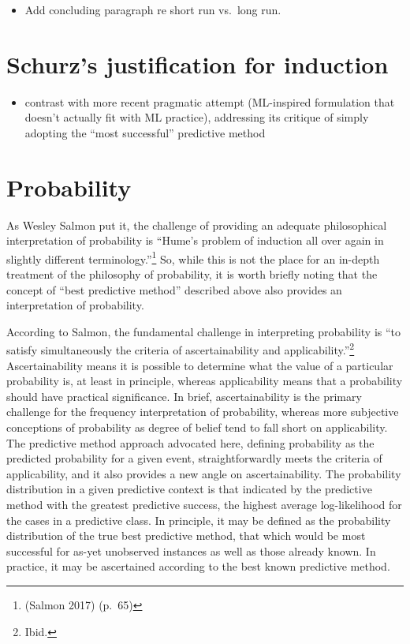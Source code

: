 \documentclass[
  letterpaper,
  DIV=11,
  numbers=noendperiod]{scrartcl}
\providecommand{\tightlist}{%
  \setlength{\itemsep}{0pt}\setlength{\parskip}{0pt}}\usepackage{longtable,booktabs,array}
\theoremstyle{definition}
\theoremstyle{remark}
\begin{document}
\begin{itemize}
\tightlist
\item
  Add concluding paragraph re short run vs.~long run.
\end{itemize}

\section{Schurz's justification for induction}\label{sec-schurz}

\begin{itemize}
\tightlist
\item
  contrast with more recent pragmatic attempt (ML-inspired formulation
  that doesn't actually fit with ML practice), addressing its critique
  of simply adopting the ``most successful'' predictive method
\end{itemize}

\section{Probability}\label{sec-intprob}

As Wesley Salmon put it, the challenge of providing an adequate
philosophical interpretation of probability is ``Hume's problem of
induction all over again in slightly different terminology.''\footnote{(Salmon
  2017) (p.~65)} So, while this is not the place for an in-depth
treatment of the philosophy of probability, it is worth briefly noting
that the concept of ``best predictive method'' described above also
provides an interpretation of probability.

According to Salmon, the fundamental challenge in interpreting
probability is ``to satisfy simultaneously the criteria of
ascertainability and applicability.''\footnote{Ibid.} Ascertainability
means it is possible to determine what the value of a particular
probability is, at least in principle, whereas applicability means that
a probability should have practical significance. In brief,
ascertainability is the primary challenge for the frequency
interpretation of probability, whereas more subjective conceptions of
probability as degree of belief tend to fall short on applicability. The
predictive method approach advocated here, defining probability as the
predicted probability for a given event, straightforwardly meets the
criteria of applicability, and it also provides a new angle on
ascertainability. The probability distribution in a given predictive
context is that indicated by the predictive method with the greatest
predictive success, the highest average log-likelihood for the cases in
a predictive class. In principle, it may be defined as the probability
distribution of the true best predictive method, that which would be
most successful for as-yet unobserved instances as well as those already
known. In practice, it may be ascertained according to the best known
predictive method.
\end{document}
